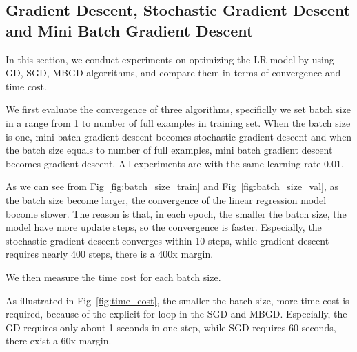 \documentclass[journal, a4paper]{IEEEtran}
\begin{document}
\subsection{Gradient Descent, Stochastic Gradient Descent and Mini Batch Gradient Descent}
In this section, we conduct experiments on optimizing the LR model by using GD, SGD, MBGD  algorrithms, and compare them in terms of convergence and time cost. \par
We first evaluate the convergence of three algorithms, specificlly we set batch size in a range from 1 to number of full examples in training set. When the batch size is one, mini batch gradient descent becomes stochastic gradient descent and when the batch size equals to number of full examples, mini batch gradient descent becomes gradient descent. All experiments are with the same learning rate 0.01.\par
As we can see from Fig~\ref{fig:batch_size_train} and Fig~\ref{fig:batch_size_val}, as the batch size become larger, the convergence of the linear regression model bocome slower. The reason is that, in each epoch, the smaller the batch size, the model have more update steps, so the convergence is faster. Especially, the stochastic gradient descent converges within 10 steps, while gradient descent requires nearly 400 steps, there is a 400x margin.\par
We then measure the time cost for each batch size. \par 
As illustrated in Fig~\ref{fig:time_cost}, the smaller the batch size, more time cost is required, because of the explicit for loop in the SGD and MBGD. Especially, the GD requires only about 1 seconds in one step, while SGD requires 60 seconds, there exist a 60x margin.  \par
\end{document}
